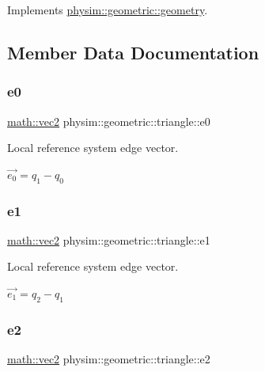 Implements \hyperlink{classphysim_1_1geometric_1_1geometry_a11c26d2fea85bf7bc41ec94cefa9729e}{physim\+::geometric\+::geometry}.



\subsection{Member Data Documentation}
\mbox{\label{classphysim_1_1geometric_1_1triangle_a5e9f0e86dc34f816805f161ce8e7ddf8}} 
\subsubsection{\texorpdfstring{e0}{e0}}
{\footnotesize\ttfamily \hyperlink{structphysim_1_1math_1_1vec2}{math\+::vec2} physim\+::geometric\+::triangle\+::e0\hspace{0.3cm}{\ttfamily [private]}}



Local reference system edge vector. 

$\vec{e_0} = q_1 - q_0$ \mbox{\label{classphysim_1_1geometric_1_1triangle_a729f755d23297af20de950d99552859a}} 
\subsubsection{\texorpdfstring{e1}{e1}}
{\footnotesize\ttfamily \hyperlink{structphysim_1_1math_1_1vec2}{math\+::vec2} physim\+::geometric\+::triangle\+::e1\hspace{0.3cm}{\ttfamily [private]}}



Local reference system edge vector. 

$\vec{e_1} = q_2 - q_1$ \mbox{\label{classphysim_1_1geometric_1_1triangle_a9e2c598ece34f8df7f37558ab09c297c}} 
\subsubsection{\texorpdfstring{e2}{e2}}
{\footnotesize\ttfamily \hyperlink{structphysim_1_1math_1_1vec2}{math\+::vec2} physim\+::geometric\+::triangle\+::e2\hspace{0.3cm}{\ttfamily [private]}}



